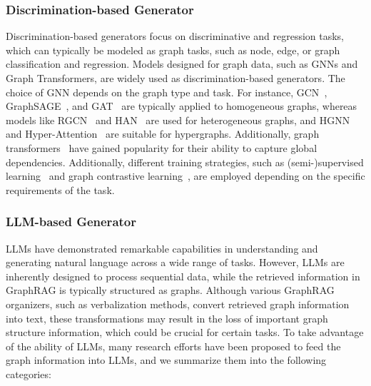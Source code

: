 \subsubsection{Discrimination-based Generator}
Discrimination-based generators focus on discriminative and regression tasks, which can typically be modeled as graph tasks, such as node, edge, or graph classification and regression. Models designed for graph data, such as GNNs and Graph Transformers, are widely used as discrimination-based generators. The choice of GNN depends on the graph type and task.  For instance, GCN~\cite{kipf2016semi}, GraphSAGE~\cite{hamilton2017inductive}, and GAT~\cite{velivckovic2017graph} are typically applied to homogeneous graphs, whereas models like RGCN~\cite{schlichtkrull2018modeling} and HAN~\cite{wang2019heterogeneous} are used for heterogeneous graphs, and HGNN~\cite{feng2019hypergraph} and Hyper-Attention~\cite{bai2021hypergraph} are suitable for hypergraphs. Additionally, graph transformers~\cite{min2022transformer, shehzad2024graph} have gained popularity for their ability to capture global dependencies.
Additionally, different training strategies, such as (semi-)supervised learning~\cite{ma2021deep} and graph contrastive learning~\cite{ju2024towards, liu2022graph}, are employed depending on the specific requirements of the task.

\subsubsection{LLM-based Generator}
LLMs have demonstrated remarkable capabilities in understanding and generating natural language across a wide range of tasks. However, LLMs are inherently designed to process sequential data, while the retrieved information in GraphRAG is typically structured as graphs. Although various GraphRAG organizers, such as verbalization methods, convert retrieved graph information into text, these transformations may result in the loss of important graph structure information, which could be crucial for certain tasks. To take advantage of the ability of LLMs, many research efforts have been proposed to feed the graph information into LLMs, and we summarize them into the following categories:

